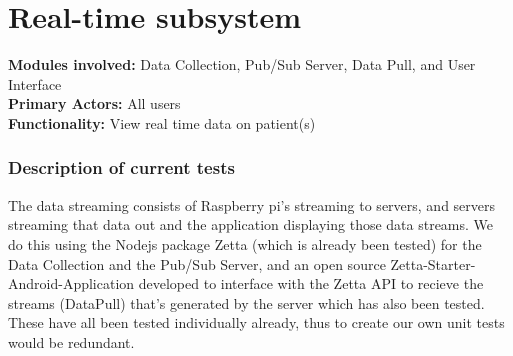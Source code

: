 \documentclass[12pt]{article}
\begin{document}
{	\pagebreak

	\section{Real-time subsystem}
	\textbf{Modules involved:} Data Collection,  Pub/Sub Server, Data Pull, and User Interface \\
	\textbf{Primary Actors:} All users \\
	\textbf{Functionality:} View real time data on patient(s)\\
	\subsubsection{Description of current tests}
	The data streaming consists of Raspberry pi's streaming to servers, and servers streaming that data out and the application displaying those data streams. We do this using the Nodejs package Zetta (which is already been tested) for the Data Collection and the Pub/Sub Server, and an open source Zetta-Starter-Android-Application developed to interface with the Zetta API to recieve the streams (DataPull) that's generated by the server which has also been tested. These have all been tested individually already, thus to create our own unit tests would be redundant. \\ \\ 

}
\end{document}
